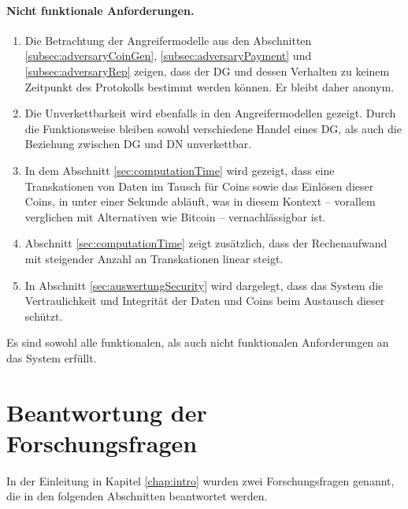 \documentclass[
	fontsize=11pt,
	headings=small,
	parskip=half,           %
	bibliography=totoc,
	numbers=noenddot,       %
	open=any,               %
]{scrreprt}
\begin{document}
\paragraph{Nicht funktionale Anforderungen.}
\begin{enumerate}
    \item Die Betrachtung der Angreifermodelle aus den Abschnitten \ref{subsec:adversaryCoinGen}, \ref{subsec:adversaryPayment} und \ref{subsec:adversaryRep} zeigen, dass der DG und dessen Verhalten zu keinem Zeitpunkt des Protokolls bestimmt werden können. Er bleibt daher anonym.
    \item Die Unverkettbarkeit wird ebenfalls in den Angreifermodellen gezeigt. Durch die Funktionsweise bleiben sowohl verschiedene Handel eines DG, als auch die Beziehung zwischen DG und DN unverkettbar.
    \item In dem Abschnitt \ref{sec:computationTime} wird gezeigt, dass eine Transkationen von Daten im Tausch für Coins sowie das Einlösen dieser Coins, in unter einer Sekunde abläuft, was in diesem Kontext -- vorallem verglichen mit Alternativen wie Bitcoin -- vernachlässigbar ist.
    \item Abschnitt \ref{sec:computationTime} zeigt zusätzlich, dass der Rechenaufwand mit steigender Anzahl an Transkationen linear steigt.
    \item In Abschnitt \ref{sec:auswertungSecurity} wird dargelegt, dass das System die Vertraulichkeit und Integrität der Daten und Coins beim Austausch dieser schützt.
\end{enumerate}

Es sind sowohl alle funktionalen, als auch nicht funktionalen Anforderungen an das System erfüllt.

\section{Beantwortung der Forschungsfragen}
In der Einleitung in Kapitel \ref{chap:intro} wurden zwei Forschungsfragen genannt, die in den folgenden Abschnitten beantwortet werden.
\end{document}
